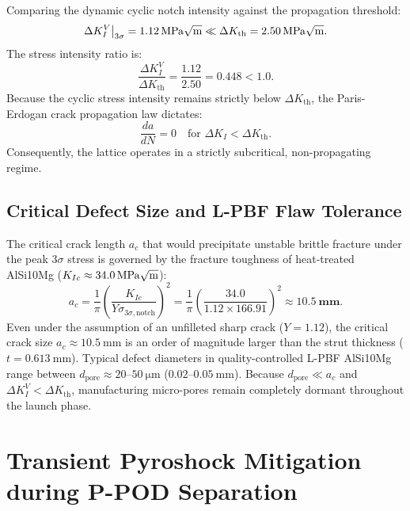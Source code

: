 Comparing the dynamic cyclic notch intensity against the propagation threshold:
\begin{equation}
\Delta K_I^V\big|_{3\sigma} = \SI{1.12}{\mega\pascal\sqrt{\meter}} \ll \Delta K_{\text{th}} = \SI{2.50}{\mega\pascal\sqrt{\meter}}.
\label{eq:threshold_comparison}
\end{equation}
The stress intensity ratio is:
\begin{equation}
\frac{\Delta K_I^V}{\Delta K_{\text{th}}} = \frac{1.12}{2.50} = \mathbf{0.448} < 1.0.
\label{eq:intensity_ratio}
\end{equation}
Because the cyclic stress intensity remains strictly below $\Delta K_{\text{th}}$, the Paris-Erdogan crack propagation law dictates:
\begin{equation}
\frac{da}{dN} = 0 \quad \text{for } \Delta K_I < \Delta K_{\text{th}}.
\label{eq:paris_zero}
\end{equation}
Consequently, the lattice operates in a strictly subcritical, non-propagating regime.

\subsection{Critical Defect Size and L-PBF Flaw Tolerance}

The critical crack length $a_c$ that would precipitate unstable brittle fracture under the peak $3\sigma$ stress is governed by the fracture toughness of heat-treated AlSi10Mg ($K_{Ic} \approx \SI{34.0}{\mega\pascal\sqrt{\meter}}$):
\begin{equation}
a_c = \frac{1}{\pi} \left( \frac{K_{Ic}}{Y \sigma_{3\sigma,\text{notch}}} \right)^2 = \frac{1}{\pi} \left( \frac{34.0}{1.12 \times 166.91} \right)^2 \approx \mathbf{10.5\ \si{\milli\meter}}.
\label{eq:critical_crack_size}
\end{equation}
Even under the assumption of an unfilleted sharp crack ($Y = 1.12$), the critical crack size $a_c \approx \SI{10.5}{\milli\meter}$ is an order of magnitude larger than the strut thickness ($t = \SI{0.613}{\milli\meter}$). Typical defect diameters in quality-controlled L-PBF AlSi10Mg range between $d_{\text{pore}} \approx 20\text{--}\SI{50}{\micro\meter}$ ($0.02\text{--}\SI{0.05}{\milli\meter}$). Because $d_{\text{pore}} \ll a_c$ and $\Delta K_I^V < \Delta K_{\text{th}}$, manufacturing micro-pores remain completely dormant throughout the launch phase.

\section{Transient Pyroshock Mitigation during P-POD Separation}
\label{sec:pyroshock_mitigation}

